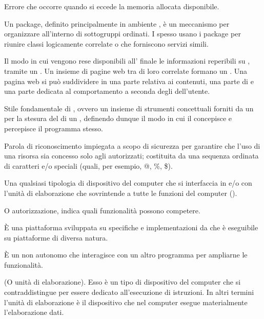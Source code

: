 {Errore che occorre quando si eccede la memoria allocata disponibile.}


{Un package, definito principalmente in ambiente , è un meccanismo per organizzare  all'interno di sottogruppi ordinati. I  spesso usano i package per riunire classi logicamente correlate o che forniscono servizi simili.}

{Il modo in cui vengono rese disponibili all' finale le informazioni reperibili su , tramite un  . Un insieme di pagine web tra di loro correlate formano un . Una pagina web si può suddividere in una parte relativa ai contenuti, una parte di  e una parte dedicata al comportamento a seconda degli  dell'utente.
}

{Stile fondamentale di , ovvero un insieme di strumenti concettuali forniti da un  per la stesura del  di un , definendo dunque il modo in cui il  concepisce e percepisce il programma stesso.}

{Parola di riconoscimento impiegata a scopo di sicurezza per garantire che l'uso di una risorsa sia concesso solo agli  autorizzati; costituita da una sequenza ordinata di caratteri  e/o speciali (quali, per esempio, @, \%, \$).}

{Una qualsiasi tipologia di dispositivo  del computer che si interfaccia in  e/o  con l'unità di elaborazione che sovrintende a tutte le funzioni del computer ().}

{O autorizzazione, indica quali funzionalità possono competere.}

{\`{E} una piattaforma  sviluppata su specifiche e implementazioni da  che è eseguibile su piattaforme  di diversa natura.}

{\`{E} un  non autonomo che interagisce con un altro programma per ampliarne le funzionalità.}

{(O unità di elaborazione). Esso è un tipo di dispositivo  del computer che si contraddistingue per essere dedicato all'esecuzione di istruzioni. In altri termini l'unità di elaborazione è il dispositivo che nel computer esegue materialmente l'elaborazione dati.}

